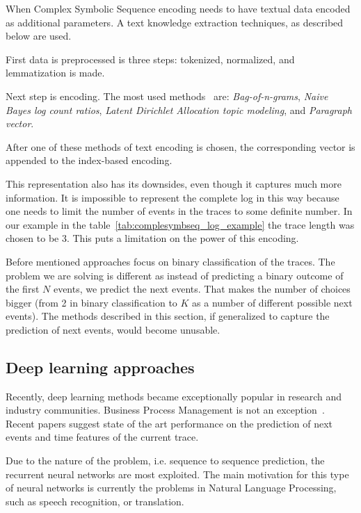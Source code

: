 When Complex Symbolic Sequence encoding needs to have textual data encoded as additional parameters. A text knowledge extraction techniques, as described below are used.

First data is preprocessed is three steps: tokenized, normalized, and lemmatization is made.

Next step is encoding. The most used methods~\cite{DBLP:conf/bpm/TeinemaaDMF16} are: \textit{Bag-of-n-grams}, \textit{Naive Bayes log count ratios}, \textit{Latent Dirichlet Allocation topic modeling}, and \textit{Paragraph vector}.

After one of these methods of text encoding is chosen, the corresponding vector is appended to the index-based encoding.

This representation also has its downsides, even though it captures much more information. It is impossible to represent the complete log in this way because one needs to limit the number of events in the traces to some definite number. In our example in the table~\ref{tab:complesymbseq_log_example} the trace length was chosen to be 3. This puts a limitation on the power of this encoding.

Before mentioned approaches focus on binary classification of the traces. The problem we are solving is different as instead of predicting a binary outcome of the first $N$ events, we predict the next events. That makes the number of choices bigger (from 2 in binary classification to $K$ as a number of different possible next events). The methods described in this section, if generalized to capture the prediction of next events, would become unusable.

\subsection{Deep learning approaches} \label{deeplearning-stateoftheart}

Recently, deep learning methods became exceptionally popular in research and industry communities. Business Process Management is not an exception~\cite{quteprints96732,niek96732,evermann}. Recent papers suggest state of the art performance on the prediction of next events and time features of the current trace.

Due to the nature of the problem, i.e. sequence to sequence prediction, the recurrent neural networks are most exploited. The main motivation for this type of neural networks is currently the problems in Natural Language Processing, such as speech recognition\cite{graves2013icassp}, or translation\cite{Sutskever2014SSL29690332969173}. 

